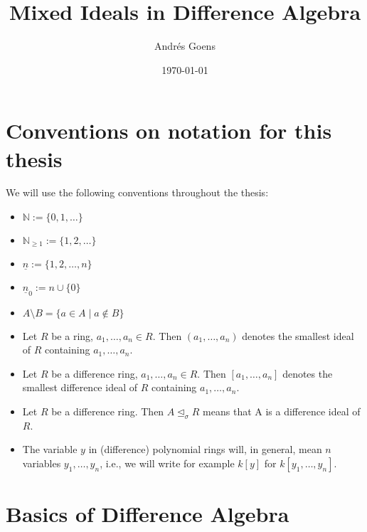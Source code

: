 \documentclass{article}
\title{Mixed Ideals in Difference Algebra}
\author{Andr\'{e}s Goens}
\date{\today}
\def\NE{\mathbb{N}_{\geq1}}
\def\N{\mathbb{N}}
\def\si{\unlhd_{\sigma}}
\def\n{\underline{n}}
\theoremstyle{plain}
\theoremstyle{definition}
\begin{document}
\setlength{\parindent}{1.5em}
\section*{Conventions on notation for this thesis} 
We will use the following conventions throughout the thesis:
\begin{itemize}
\item $\N := \{0,1,\ldots \}$
\item $\NE := \{1,2,\ldots \}$
\item $ \n := \{1,2,\ldots, n\}$
\item $ \n_0 := n \cup \{0\}$
\item $A \setminus B = \{ a \in A \mid a \notin B \}$
\item Let $R$ be a ring, $a_1,\ldots,a_n \in R$. Then $(a_1,\ldots,a_n)$ denotes the smallest ideal of $R$ containing $a_1,\ldots,a_n$.
\item Let $R$ be a difference ring, $a_1,\ldots,a_n \in R$. Then $[a_1,\ldots,a_n]$ denotes the smallest difference ideal of $R$ containing $a_1,\ldots,a_n$.
\item Let $R$ be a difference ring. Then $A \si R$ means that A is a difference ideal of $R$.
\item The variable $y$ in (difference) polynomial rings will, in general, mean $n$ variables $y_1, \ldots, y_n$, i.e., we will write for example $k[y]$ for $k[y_1,\ldots,y_n]$.
\end{itemize}
\clearpage
\section{Basics of Difference Algebra}
\end{document}
